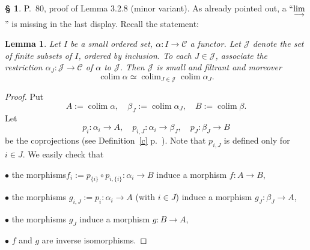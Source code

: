 \documentclass[12pt]{article}%
\newtheorem{lem}[thm]{Lemma}
\theoremstyle{remark}
\theoremstyle{definition}
\newtheorem{s}[thm]{\S}%
\newcommand{\bu}{\bullet}
\newcommand{\cc}{\mathcal}
\newcommand{\C}{\mathcal C}
\newcommand{\ilim}{\operatornamewithlimits{\underset{\longrightarrow}{lim}}}
\DeclareMathOperator*{\colim}{colim}
\begin{document}
\begin{s} 
P.~80, proof of Lemma 3.2.8 (minor variant). As already pointed out, a ``$\ds\ilim$'' is missing in the last display. Recall the statement:
\begin{lem}
Let $I$ be a small ordered set, $\alpha:I\to\C$ a functor. Let $\cc J$ denote the set of finite subsets of $I$, ordered by inclusion. To each $J\in\cc J$, associate the restriction $\alpha_J:\cc J\to\C$ of $\alpha$ to $\cc J$. Then $\cc J$ is small and filtrant and moreover
$$
\colim\alpha\simeq\colim_{J\in\cc J}\colim\alpha_J.
$$
\end{lem}
\begin{proof}
Put
$$
A:=\colim\alpha,\quad
\beta_J:=\colim\alpha_J,\quad
B:=\colim\beta.
$$
Let 
$$
p_i:\alpha_i\to A,\quad 
p_{i,J}:\alpha_i\to\beta_J,\quad 
p_J:\beta_J\to B
$$
be the coprojections (see Definition~\ref{c} p.~\pageref{c}). Note that $p_{i,J}$ is defined only for $i\in J$. We easily check that 

\noindent$\bu$ the morphisms$f_i:=p_{\{i\}}\circ p_{i,\{i\}}:\alpha_i\to B$ induce a morphism $f:A\to B$, 

\noindent$\bu$ the morphisms $g_{i,J}:=p_i:\alpha_i\to A$ (with $i\in J$) induce a morphism $g_J:\beta_J\to A$, 

\noindent$\bu$ the morphisms $g_J$ induce a morphism $g:B\to A$, 

\noindent$\bu$ $f$ and $g$ are inverse isomorphisms.
\end{proof}
\end{s}

%
\end{document}
